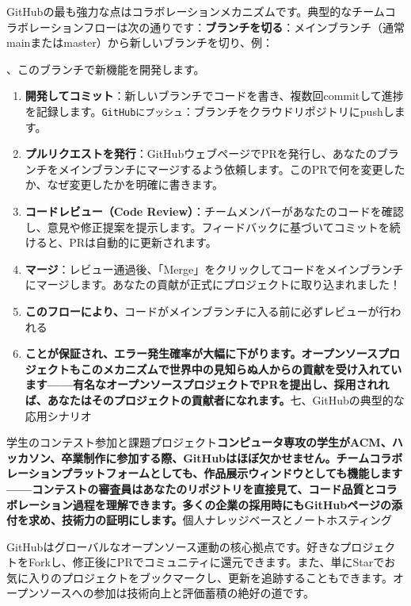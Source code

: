 GitHubの最も強力な点はコラボレーションメカニズムです。典型的なチームコラボレーションフローは次の通りです：\textbf{ブランチを切る}：メインブランチ（通常mainまたはmaster）から新しいブランチを切り、例：


、このブランチで新機能を開発します。

\begin{enumerate}
  \item \textbf{開発してコミット}：新しいブランチでコードを書き、複数回commitして進捗を記録します。\texttt{GitHubにプッシュ}：ブランチをクラウドリポジトリにpushします。
  \item \textbf{プルリクエストを発行}：GitHubウェブページでPRを発行し、あなたのブランチをメインブランチにマージするよう依頼します。このPRで何を変更したか、なぜ変更したかを明確に書きます。
  \item \textbf{コードレビュー（Code Review）}：チームメンバーがあなたのコードを確認し、意見や修正提案を提示します。フィードバックに基づいてコミットを続けると、PRは自動的に更新されます。
  \item \textbf{マージ}：レビュー通過後、「Merge」をクリックしてコードをメインブランチにマージします。あなたの貢献が正式にプロジェクトに取り込まれました！
  \item \textbf{このフローにより、}コードがメインブランチに入る前に必ずレビューが行われる
  \item \textbf{ことが保証され、エラー発生確率が大幅に下がります。オープンソースプロジェクトもこのメカニズムで世界中の見知らぬ人からの貢献を受け入れています——有名なオープンソースプロジェクトでPRを提出し、採用されれば、あなたはそのプロジェクトの貢献者になれます。}七、GitHubの典型的な応用シナリオ
\end{enumerate}

学生のコンテスト参加と課題プロジェクト\textbf{コンピュータ専攻の学生がACM、ハッカソン、卒業制作に参加する際、GitHubはほぼ欠かせません。チームコラボレーションプラットフォームとしても、作品展示ウィンドウとしても機能します——コンテストの審査員はあなたのリポジトリを直接見て、コード品質とコラボレーション過程を理解できます。多くの企業の採用時にもGitHubページの添付を求め、技術力の証明にします。}個人ナレッジベースとノートホスティング



GitHubはグローバルなオープンソース運動の核心拠点です。好きなプロジェクトをForkし、修正後にPRでコミュニティに還元できます。また、単にStarでお気に入りのプロジェクトをブックマークし、更新を追跡することもできます。オープンソースへの参加は技術向上と評価蓄積の絶好の道です。

